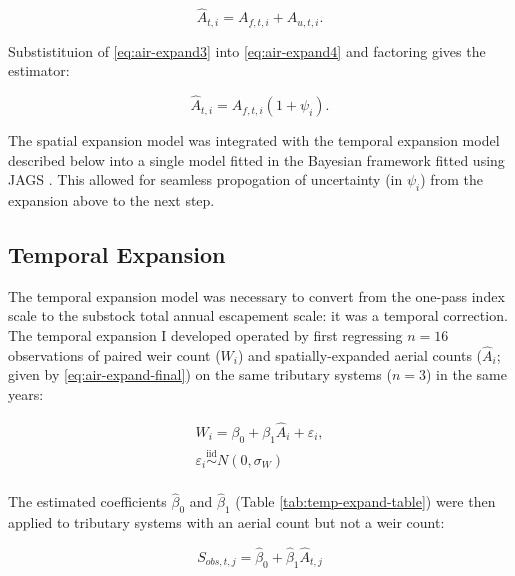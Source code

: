 \documentclass[12pt,]{book}
\theoremstyle{definition}
\theoremstyle{definition}
\theoremstyle{definition}
\theoremstyle{remark}
\begin{document}
\begin{equation}
  \hat{A}_{t,i} = A_{f,t,i} + A_{u,t,i}.
  \label{eq:air-expand4}
\end{equation}

\noindent
Substistituion of \eqref{eq:air-expand3} into \eqref{eq:air-expand4} and
factoring gives the estimator:

\begin{equation}
  \hat{A}_{t,i}=A_{f,t,i}(1 + \psi_i).
  \label{eq:air-expand-final}
\end{equation}

\noindent
The spatial expansion model was integrated with the temporal expansion
model described below into a single model fitted in the Bayesian
framework fitted using JAGS \citep{plummer-2017}. This allowed for
seamless propogation of uncertainty (in \(\psi_i\)) from the expansion
above to the next step.

\subsection{Temporal Expansion}\label{temp-expansion}

\noindent
The temporal expansion model was necessary to convert from the one-pass
index scale to the substock total annual escapement scale: it was a
temporal correction. The temporal expansion I developed operated by
first regressing \(n = 16\) observations of paired weir count (\(W_i\))
and spatially-expanded aerial counts (\(\hat{A}_{i}\); given by
\eqref{eq:air-expand-final}) on the same tributary systems (\(n = 3\)) in
the same years:

\begin{equation}
  \begin{split}
    W_i = \beta_0 + \beta_1 \hat{A}_i + \varepsilon_i, \\
    \varepsilon_i \stackrel{\text{iid}}{\sim} N(0, \sigma_W) \\
  \end{split}
\label{eq:temp-expand1}
\end{equation}

The estimated coefficients \(\hat{\beta}_0\) and \(\hat{\beta}_1\)
(Table \ref{tab:temp-expand-table}) were then applied to tributary
systems with an aerial count but not a weir count:

\begin{equation}
  S_{obs,t,j}=\hat{\beta}_0 + \hat{\beta}_1 \hat{A}_{t,j}
\label{eq:temp-expand2}
\end{equation}
\end{document}
